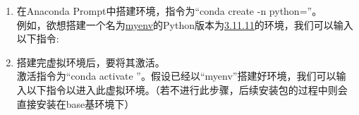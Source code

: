 \documentclass[11pt]{article}
\begin{document}
    \begin{enumerate}
    	\item 在Anaconda Prompt中搭建环境，指令为“conda create -n  python=”。\\
    	例如，欲想搭建一个名为\underline{myenv}的Python版本为\underline{3.11.11}的环境，我们可以输入以下指令:
    	\begin{center}
    	\end{center}
    	
    	\item 搭建完虚拟环境后，要将其激活。\\
    	激活指令为“conda activate ”。假设已经以“myenv”搭建好环境，我们可以输入以下指令以进入此虚拟环境。（若不进行此步骤，后续安装包的过程中则会直接安装在base基环境下）
    	\begin{center}
    	\end{center}
    	

\end{enumerate}
\end{document}
